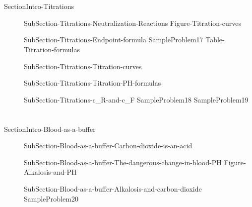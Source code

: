 \documentclass[main.tex]{subfiles}
\begin{document}
\section{\color{blue!30!black}{Titrations}}{SectionIntro-Titrations}
\sloppy
\begin{description}
\item[] {SubSection-Titrations-Neutralization-Reactions}
  {Figure-Titration-curves}

\item[] {SubSection-Titrations-Endpoint-formula}
  {SampleProblem17}
     {Table-Titration-formulas}

\item[] {SubSection-Titrations-Titration-curves}
 
   
\item[] 
{SubSection-Titrations-Titration-PH-formulas}
\item[] 
{SubSection-Titrations-c_R-and-c_F}
   {SampleProblem18}
  {SampleProblem19}
 
 
\end{description}
\section{\color{blue!30!black}{Blood as a buffer}}{SectionIntro-Blood-as-a-buffer}
 
\sloppy
\begin{description}
\item[] {SubSection-Blood-as-a-buffer-Carbon-dioxide-is-an-acid}
\item[] 
{SubSection-Blood-as-a-buffer-The-dangerous-change-in-blood-PH}
  {Figure-Alkalosis-and-PH}
\item[] 
{SubSection-Blood-as-a-buffer-Alkalosis-and-carbon-dioxide}
   {SampleProblem20}
 \end{description}
 
\end{document}
